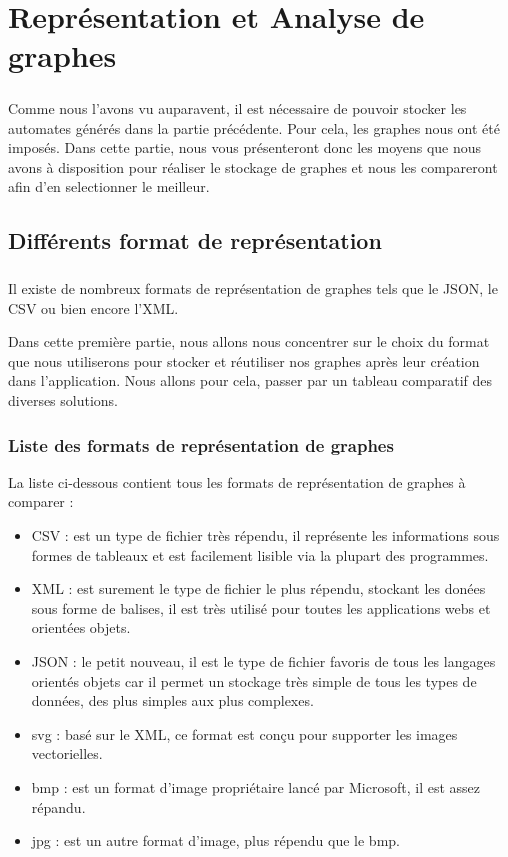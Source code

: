 \chapter{Représentation et Analyse de graphes}
\paragraph{}

Comme nous l'avons vu auparavent, il est nécessaire de pouvoir stocker les automates générés dans la partie précédente. Pour cela, les graphes nous ont été imposés. Dans cette partie, nous vous présenteront donc les moyens que nous avons à disposition pour réaliser le stockage de graphes et nous les compareront afin d'en selectionner le meilleur.

\section{Différents format de représentation}
  \paragraph{}
  Il existe de nombreux formats de représentation de graphes tels que le JSON, le CSV ou bien encore l'XML.
  
  Dans cette première partie, nous allons nous concentrer sur le choix du format que nous utiliserons pour stocker et réutiliser nos graphes après leur création dans l'application.
  Nous allons pour cela, passer par un tableau comparatif des diverses solutions.
  

  \subsection{Liste des formats de représentation de graphes}
  La liste ci-dessous contient tous les formats de représentation de graphes à comparer : 
  \begin{itemize}
   \item CSV : est un type de fichier très répendu, il représente les informations sous formes de tableaux et est facilement lisible via la plupart des programmes. 
   \item XML : est surement le type de fichier le plus répendu, stockant les donées sous forme de balises, il est très utilisé pour toutes les applications webs et orientées objets. 
   \item JSON : le petit nouveau, il est le type de fichier favoris de tous les langages orientés objets car il permet un stockage très simple de tous les types de données, des plus simples aux plus complexes. 
   \item svg : basé sur le XML, ce format est conçu pour supporter les images vectorielles.
   \item bmp : est un format d'image propriétaire lancé par Microsoft, il est assez répandu.
   \item jpg : est un autre format d'image, plus répendu que le bmp.
  \end{itemize}

